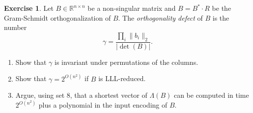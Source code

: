 \documentclass[12pt,a4paper]{article}
\theoremstyle{plain}
\newtheorem*{Sol*}{Solution}
\theoremstyle{definition}
\newtheorem{Ex}{Exercise}
\newif\ifsolutions
\newcommand{\exercise}[2]{
			\begin{Ex} #1 \end{Ex}
			\ifsolutions  \begin{Sol*} #2 \end{Sol*} \bigskip \else \bigskip  \fi
		}
\begin{document}
\exercise{
  Let $Β∈ ℝ^{n ×n}$ be a non-singular matrix and $B = B^* ⋅ R$ be the Gram-Schmidt orthogonalization  of $B$. The \emph{orthogonality defect} of $B$ is the number
  \begin{displaymath}
    γ = \frac{∏_i \| b_i \|_2}{|\det(B)|}.  
  \end{displaymath}

  \begin{enumerate}
  \item Show that $γ$ is invariant under permutations of the columns. 
  \item Show that $γ = 2^{O(n^2)}$ if $B$ is LLL-reduced.
  \item  Argue, using set 8, that a shortest vector of $Λ(B)$ can be computed in time $2^{O(n^2)}$ plus  a polynomial in the input encoding of $B$. 
  \end{enumerate}
}{
	 \begin{enumerate}[i)]
		\item This is clear since the denominator of $\gamma$ was written as an absolute determinant.

		\item If $B$ is an LLL-reduce basis, then the order relations
			\[ \| b_i^* \|_2^2 \leq 2 \| b_{i+1}^* \|^2_2, \quad \text{ for each $i=1, \dots, n-1$} \]
		and the fact that $\mu_{ij}^2 \leq 1/4$ for each $i,j$ imply that 
			\begin{align*}
				\| b_i \|^2 &\leq \| b_i^* \|^2 + \frac14 \sum_{j=1}^{i-1} \| b_j^* \|^2, \\
						& \leq \| b_i^* \|^2 + \frac14 \sum_{j=1}^{i-1} 2^{i-j} \| b_i^* \|^2, \\
						& \leq \| b_i^* \|^2 \left( 1 + \frac14 (2^i -2) \right) \leq 2^{i-1} \| b_i^* \|^2 \quad \text{ for each $i=1, \dots n$} .
			\end{align*}
		The orthogonality defect may therefore be bounded by
			\[ \gamma^2 \leq 2^{n(n-1)/2} = 2^{\mathcal{O}(n^2)}, \]
		which is the required result.

		\item 
		Last set, we saw a $2^{\mathcal{O}(n \log n)}\cdot \gamma$ algorithm to solve the shortest vector problem.
		Reducing the basis before applying that algorithm adds a polynomial factor in the input encoding of $B$.
	\end{enumerate}

}
\end{document}
